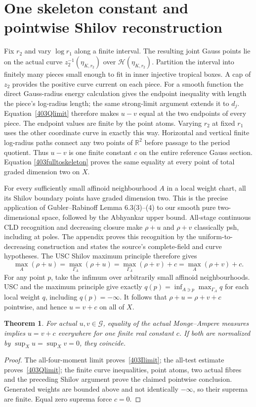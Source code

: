 \documentclass[11pt]{article}
\newcommand{\G}{\mathcal G}
\newcommand{\RR}{\mathbb R}
\newcommand{\HH}{\mathscr H}
\newtheorem{theorem}{Theorem}
\theoremstyle{remark}\newtheorem{remark}[theorem]{Remark}
\begin{document}
\section{One skeleton constant and pointwise Shilov reconstruction}
Fix $r_2$ and vary $\log r_1$ along a finite interval.
The resulting joint Gauss points lie on the actual
curve $z_2^{-1}(\eta_{K,r_2})$ over
$\HH(\eta_{K,r_2})$. Partition the interval into
finitely many pieces small enough to fit in inner
injective tropical boxes. A cap of $z_2$ provides
the positive curve current on each piece.
For a smooth function the direct Gauss-radius energy
calculation gives the endpoint inequality with length
the piece's log-radius length; the same strong-limit
argument extends it to $d_j$. Equation~\eqref{403Qlimit}
therefore makes $u-v$ equal at the two endpoints of
every piece. The endpoint values are finite by the
point atoms. Varying $r_2$ at fixed $r_1$ uses the
other coordinate curve in exactly this way.
Horizontal and vertical finite log-radius paths
connect any two points of $\RR^2$ before passage to
the period quotient. Thus $u-v$ is one finite constant
$c$ on the entire reference Gauss section. Equation
\eqref{403fulltoskeleton} proves the same equality at
every point of total graded dimension two on $X$.

For every sufficiently small affinoid neighbourhood
$A$ in a local weight chart, all its Shilov boundary
points have graded dimension two. This is the precise
application of Gubler--Rabinoff Lemma 6.3(3)--(4) to
our smooth pure two-dimensional space, followed by
the Abhyankar upper bound. All-stage continuous CLD
recognition and decreasing closure make $\rho+u$
and $\rho+v$ classically psh, including at poles.
The appendix proves this recognition by the
uniform-to-decreasing construction and states the
source's complete-field and curve hypotheses.
The USC Shilov maximum principle therefore gives
\[
\max_A(\rho+u)=\max_{\Gamma_A}(\rho+u)
=\max_{\Gamma_A}(\rho+v)+c=\max_A(\rho+v)+c.
\]
For any point $p$, take the infimum over arbitrarily
small affinoid neighbourhoods. USC and the maximum
principle give exactly
$q(p)=\inf_{A\ni p}\max_{\Gamma_A}q$ for each local
weight $q$, including $q(p)=-\infty$.
It follows that $\rho+u=\rho+v+c$ pointwise,
and hence $u=v+c$ on all of $X$.

\begin{theorem}\label{403uniqueness}
For actual $u,v\in\G$, equality of the actual
Monge--Ampere measures implies $u=v+c$ everywhere
for one finite real constant $c$. If both are
normalized by $\sup_Xu=\sup_Xv=0$, they coincide.
\end{theorem}
\begin{proof}
The all-four-moment limit proves~\eqref{403Ilimit};
the all-test estimate proves~\eqref{403Qlimit};
the finite curve inequalities, point atoms, two
actual fibres and the preceding Shilov argument
prove the claimed pointwise conclusion. Generated
weights are bounded above and not identically
$-\infty$, so their suprema are finite. Equal zero
suprema force $c=0$.
\end{proof}
\end{document}

